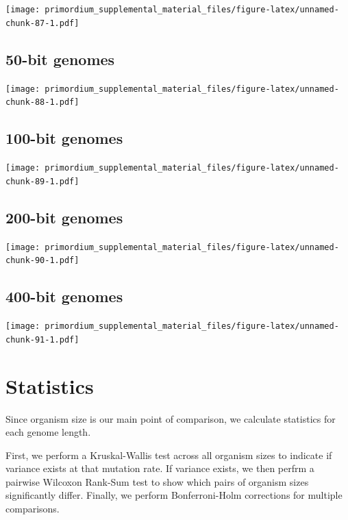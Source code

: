 \documentclass[]{book}
\begin{document}
\texttt{[image: primordium\_supplemental\_material\_files/figure-latex/unnamed-chunk-87-1.pdf]}

\hypertarget{bit-genomes-1}{%
\subsection{50-bit genomes}\label{bit-genomes-1}}

\texttt{[image: primordium\_supplemental\_material\_files/figure-latex/unnamed-chunk-88-1.pdf]}

\hypertarget{bit-genomes-2}{%
\subsection{100-bit genomes}\label{bit-genomes-2}}

\texttt{[image: primordium\_supplemental\_material\_files/figure-latex/unnamed-chunk-89-1.pdf]}

\hypertarget{bit-genomes-3}{%
\subsection{200-bit genomes}\label{bit-genomes-3}}

\texttt{[image: primordium\_supplemental\_material\_files/figure-latex/unnamed-chunk-90-1.pdf]}

\hypertarget{bit-genomes-4}{%
\subsection{400-bit genomes}\label{bit-genomes-4}}

\texttt{[image: primordium\_supplemental\_material\_files/figure-latex/unnamed-chunk-91-1.pdf]}

\hypertarget{statistics-5}{%
\section{Statistics}\label{statistics-5}}

Since organism size is our main point of comparison, we calculate statistics for each genome length.

First, we perform a Kruskal-Wallis test across all organism sizes to indicate if variance exists at that mutation rate.
If variance exists, we then perfrm a pairwise Wilcoxon Rank-Sum test to show which pairs of organism sizes significantly differ.
Finally, we perform Bonferroni-Holm corrections for multiple comparisons.
\end{document}
